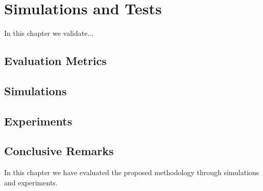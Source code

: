\chapter{Simulations and Tests}
\label{chap:Simulations}
\thispagestyle{plain}

\vspace{0.5cm}

\noindent In this chapter we validate...


\section{Evaluation Metrics}
\label{sec:metrics}

\section{Simulations}

\section{Experiments}

\section{Conclusive Remarks}
In this chapter we have evaluated the proposed methodology through simulations and experiments.